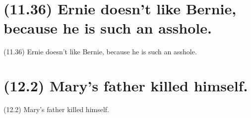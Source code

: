 \documentclass{article}
\begin{document}
\clearpage

%
%

\section*{(11.36) Ernie doesn't like Bernie, because he is such an asshole.}

\bigbreak
\begin{enumerate*}
\item[(11.36)] Ernie doesn't like Bernie, because he is such an asshole.
\end{enumerate*}
\bigbreak

\bigbreak
\begin{minipage}{\textwidth}
\end{minipage}
\bigbreak

\clearpage

%
%

\section*{(12.2) Mary's father killed himself.}

\bigbreak
\begin{enumerate*}
\item[(12.2)] Mary's father killed himself.
\end{enumerate*}
\bigbreak

\bigbreak
\begin{minipage}{\textwidth}
\end{minipage}
\bigbreak
\end{document}
